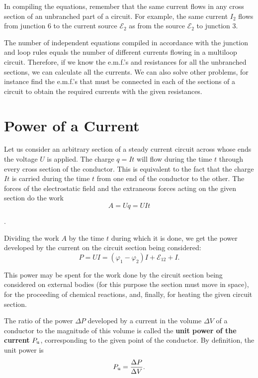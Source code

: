 In compiling the equations, remember that the same current flows in any cross section of an unbranched part of a circuit. For example, the same current $I_2$ flows from junction $6$ to the current source $\mathcal{E}_2$ as from the source $\mathcal{E}_2$ to junction $3$.

The number of independent equations compiled in accordance with the junction and loop rules equals the number of different currents flowing in a multiloop circuit. Therefore, if we know the e.m.f.'s and resistances for all the unbranched sections, we can calculate all the currents. We can also solve other problems, for instance find the e.m.f.'s that must be connected in each of the sections of a circuit to obtain the required currents with the given resistances.

\section{Power of a Current}\label{sec:5_7}

Let us consider an arbitrary section of a steady current circuit across whose ends the voltage $U$ is applied. The charge $q=It$ will flow during the time $t$ through every cross section of the conductor. This is equivalent to the fact that the charge $It$ is carried during the time $t$ from one end of the conductor to the other. The forces of the electrostatic field and the extraneous forces acting on the given section do the work
\begin{equation}\label{eq:5_32}
    A = U q = U I t
\end{equation}

.

Dividing the work $A$ by the time $t$ during which it is done, we get the power developed by the current on the circuit section being considered:
\begin{equation}\label{eq:5_33}
    P = U I = (\varphi_1 - \varphi_2) I + \mathcal{E}_{12} + I.
\end{equation}

\noindent
This power may be spent for the work done by the circuit section being considered on external bodies (for this purpose the section must move in space), for the proceeding of chemical reactions, and, finally, for heating the given circuit section.

The ratio of the power $\Delta{P}$ developed by a current in the volume $\Delta{V}$ of a conductor to the magnitude of this volume is called the \textbf{unit power of the current} $P_{\text{u}}$, corresponding to the given point of the conductor. By definition, the unit power is
\begin{equation}\label{eq:5_34}
    P_{\text{u}} = \frac{\Delta{P}}{\Delta{V}}.
\end{equation}

